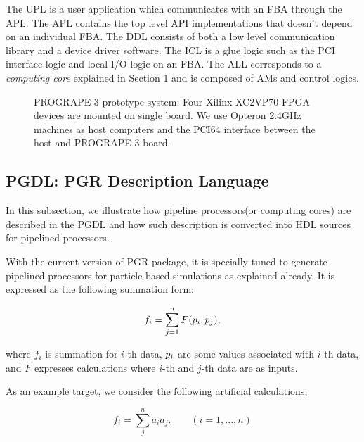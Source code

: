 \documentclass{article}
\begin{document}
The UPL is a user application which communicates with an FBA through the APL.
The APL contains the top level API implementations that
doesn't depend on an individual FBA.
The DDL consists of both a low level communication library and a device driver software. 
The ICL is a glue logic such as the PCI interface logic and 
local I/O logic on an FBA.
The ALL corresponds to a {\it computing core} explained in Section 1
and is composed of AMs and control logics.


\begin{figure}[t]
\begin{minipage}[b]{1.0\linewidth}\centering
  \centerline{}
\end{minipage}
\caption{PROGRAPE-3 prototype system: Four Xilinx XC2VP70 FPGA devices are mounted on single board. We use Opteron 2.4GHz machines as host computers and the PCI64 interface between the host and PROGRAPE-3 board.}\label{photopg3}
\end{figure}



\subsection{PGDL: PGR Description Language}
\label{SecPGDL}
In this subsection, we illustrate how pipeline processors(or computing cores)
are described in the PGDL and how such description is converted 
into HDL sources for pipelined processors.

With the current version of PGR package, 
it is specially tuned to generate pipelined processors
for particle-based simulations as explained already.
It is expressed as the following summation form:

\begin{equation}
f_i = \sum_{j = 1}^{n} F(\boldmath{p}_i, \boldmath{p}_j),
\end{equation}

where $f_i$ is summation for $i$-th data, $\boldmath{p}_i$ are
some values associated with $i$-th data, and
$F$ expresses calculations where $i$-th and $j$-th data are as inputs.

As an example target, we consider the following artificial calculations;

\begin{equation}
f_i = \sum_j^n {a_i a_j}.\qquad (i=1,...,n)
\end{equation}
\end{document}
